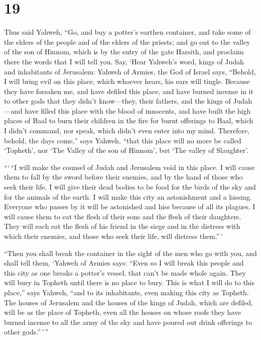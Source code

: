 \hypertarget{section-18}{%
\section{19}\label{section-18}}

 Thus said Yahweh, ``Go, and buy a potter's earthen
container, and take some of the elders of the people and of the elders
of the priests;  and go out to the valley of the son of
Hinnom, which is by the entry of the gate Harsith, and proclaim there
the words that I will tell you.  Say, `Hear Yahweh's word,
kings of Judah and inhabitants of Jerusalem: Yahweh of Armies, the God
of Israel says, ``Behold, I will bring evil on this place, which whoever
hears, his ears will tingle.  Because they have forsaken me,
and have defiled this place, and have burned incense in it to other gods
that they didn't know---they, their fathers, and the kings of
Judah---and have filled this place with the blood of innocents,
 and have built the high places of Baal to burn their
children in the fire for burnt offerings to Baal, which I didn't
command, nor speak, which didn't even enter into my mind. 
Therefore, behold, the days come,'' says Yahweh, ``that this place will
no more be called `Topheth', nor `The Valley of the son of Hinnom', but
`The valley of Slaughter'.

 ```\,``I will make the counsel of Judah and Jerusalem void
in this place. I will cause them to fall by the sword before their
enemies, and by the hand of those who seek their life. I will give their
dead bodies to be food for the birds of the sky and for the animals of
the earth.  I will make this city an astonishment and a
hissing. Everyone who passes by it will be astonished and hiss because
of all its plagues.  I will cause them to eat the flesh of
their sons and the flesh of their daughters. They will each eat the
flesh of his friend in the siege and in the distress with which their
enemies, and those who seek their life, will distress them.''\,'

 ``Then you shall break the container in the sight of the
men who go with you,  and shall tell them, `Yahweh of
Armies says: ``Even so I will break this people and this city as one
breaks a potter's vessel, that can't be made whole again. They will bury
in Topheth until there is no place to bury.  This is what I
will do to this place,'' says Yahweh, ``and to its inhabitants, even
making this city as Topheth.  The houses of Jerusalem and
the houses of the kings of Judah, which are defiled, will be as the
place of Topheth, even all the houses on whose roofs they have burned
incense to all the army of the sky and have poured out drink offerings
to other gods.''\,'\,''

